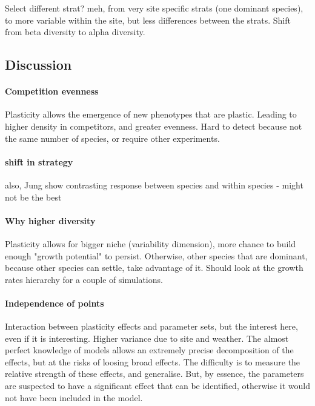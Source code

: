 Select different strat? meh, from very site specific strats (one dominant species), to more variable within the site, but less differences between the strats. Shift from beta diversity to alpha diversity.



\subsection{Discussion}
\paragraph{Competition evenness}

Plasticity allows the emergence of new phenotypes that are plastic. Leading to higher density in competitors, and greater evenness. Hard to detect because not the same number of species, or require other experiments. 

\paragraph{shift in strategy}


also, Jung \cite{jung_intraspecific_2014} show contrasting response between species and within species - might not be the best 

\paragraph{Why higher diversity}

Plasticity allows for bigger niche (variability dimension), more chance to build enough "growth potential" to persist. Otherwise, other species that are dominant, because other species can settle, take advantage of it.
Should look at the growth rates hierarchy for a couple of simulations.


\paragraph{Independence of points}

Interaction between plasticity effects and parameter sets, but the interest here, even if  it is interesting. Higher variance due to site and weather. The almost perfect knowledge of models allows an extremely precise decomposition of the effects, but at the risks of loosing broad effects. The difficulty is to measure the relative strength of these effects, and generalise. But, by essence, the parameters are suspected to have a significant effect that can be identified, otherwise it would not have been included in the model.